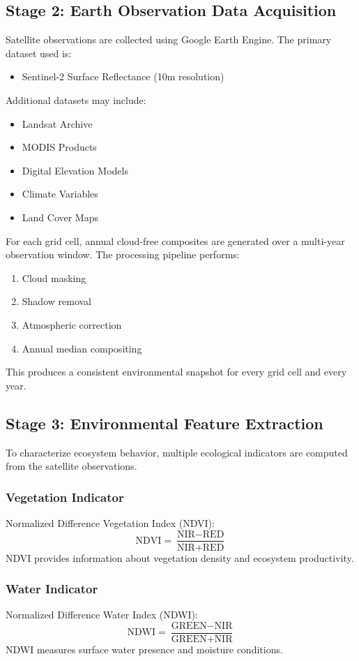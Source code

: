 \documentclass[11pt,a4paper]{article}
\begin{document}
\subsection{Stage 2: Earth Observation Data Acquisition}
Satellite observations are collected using Google Earth Engine. The primary dataset used is:
\begin{itemize}
\item Sentinel-2 Surface Reflectance (10m resolution)
\end{itemize}
Additional datasets may include:
\begin{itemize}
\item Landsat Archive
\item MODIS Products
\item Digital Elevation Models
\item Climate Variables
\item Land Cover Maps
\end{itemize}
For each grid cell, annual cloud-free composites are generated over a multi-year observation window. The processing pipeline performs:
\begin{enumerate}
\item Cloud masking
\item Shadow removal
\item Atmospheric correction
\item Annual median compositing
\end{enumerate}
This produces a consistent environmental snapshot for every grid cell and every year.

\subsection{Stage 3: Environmental Feature Extraction}
To characterize ecosystem behavior, multiple ecological indicators are computed from the satellite observations.

\subsubsection{Vegetation Indicator}
Normalized Difference Vegetation Index (NDVI):
\[
\text{NDVI} = \frac{\text{NIR} - \text{RED}}{\text{NIR} + \text{RED}}
\]
NDVI provides information about vegetation density and ecosystem productivity.

\subsubsection{Water Indicator}
Normalized Difference Water Index (NDWI):
\[
\text{NDWI} = \frac{\text{GREEN} - \text{NIR}}{\text{GREEN} + \text{NIR}}
\]
NDWI measures surface water presence and moisture conditions.
\end{document}
